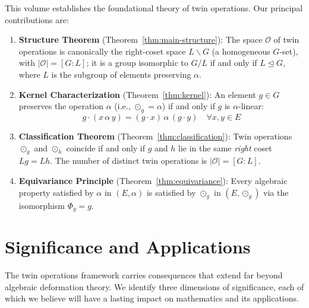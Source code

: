 \documentclass[11pt,a4paper,openany]{book}
\theoremstyle{plain}
\theoremstyle{definition}
\newcommand{\twing}[1]{\odot_{#1}}
\newcommand{\opspace}{\mathcal{O}}
\newcommand{\lingroup}{L}
\newcommand{\actspace}{E}
\newcommand{\groupG}{G}
\begin{document}
This volume establishes the foundational theory of twin operations. Our principal contributions are:

\begin{enumerate}[leftmargin=*]
    \item \textbf{Structure Theorem} (Theorem~\ref{thm:main-structure}): The space $\opspace$ of twin operations is canonically the right-coset space $\lingroup\backslash\groupG$ (a homogeneous $\groupG$-set), with $|\opspace|=[\groupG:\lingroup]$; it is a group isomorphic to $\groupG/\lingroup$ if and only if $\lingroup\trianglelefteq\groupG$, where $\lingroup$ is the subgroup of elements preserving $\alpha$.
    
    \item \textbf{Kernel Characterization} (Theorem~\ref{thm:kernel}): An element $g \in \groupG$ preserves the operation $\alpha$ (i.e., $\twing{g} = \alpha$) if and only if $g$ is $\alpha$-linear:
    \[
    g \cdot (x \,\alpha\, y) = (g \cdot x) \,\alpha\, (g \cdot y) \quad \forall x,y \in \actspace
    \]
    
    \item \textbf{Classification Theorem} (Theorem~\ref{thm:classification}): Twin operations $\twing{g}$ and $\twing{h}$ coincide if and only if $g$ and $h$ lie in the same \emph{right} coset $\lingroup g=\lingroup h$. The number of distinct twin operations is $|\opspace| = [\groupG : \lingroup]$.
    
    \item \textbf{Equivariance Principle} (Theorem~\ref{thm:equivariance}): Every algebraic property satisfied by $\alpha$ in $(\actspace, \alpha)$ is satisfied by $\twing{g}$ in $(\actspace, \twing{g})$ via the isomorphism $\Phi_g = g$.
\end{enumerate}

\section{Significance and Applications}

The twin operations framework carries consequences that extend far beyond algebraic deformation theory. We identify three dimensions of significance, each of which we believe will have a lasting impact on mathematics and its applications.
\end{document}
